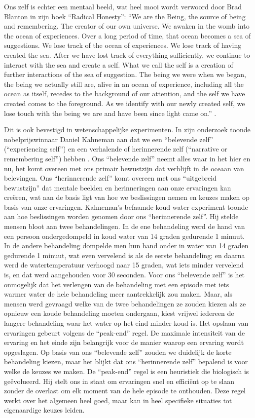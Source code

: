 \documentclass[
  11pt,
]{book}
\begin{document}
Ons zelf is echter een mentaal beeld, wat heel mooi wordt verwoord door Brad Blanton in zijn boek ``Radical Honesty'': ``We are the Being, the source of being and remembering. The creator of our own universe. We awaken in the womb into the ocean of experiences. Over a long period of time, that ocean becomes a sea of suggestions. We lose track of the ocean of experiences. We lose track of having created the sea. After we have lost track of everything sufficiently, we continue to interact with the sea and create a self. What we call the self is a creation of further interactions of the sea of suggestion. The being we were when we began, the being we actually still are, alive in an ocean of experience, including all the ocean as itself, recedes to the background of our attention, and the self we have created comes to the foreground. As we identify with our newly created self, we lose touch with the being we are and have been since light came on.'' \citep{Blanton1996}.

Dit is ook bevestigd in wetenschappelijke experimenten. In zijn onderzoek toonde nobelprijswinnaar Daniel Kahneman aan dat we een ``belevende zelf'' (``experiencing self'') en een verhalende of herinnerende zelf (``narrative or remembering self'') hebben \citep{Kahneman2012}. Ons ``belevende zelf'' neemt alles waar in het hier en nu, het komt overeen met ons primair bewustzijn dat verblijft in de oceaan van belevingen. Ons ``herinnerende zelf'' komt overeen met ons ``uitgebreid bewustzijn'' dat mentale beelden en herinneringen aan onze ervaringen kan creëren, wat aan de basis ligt van hoe we beslissingen nemen en keuzes maken op basis van onze ervaringen. Kahneman's befaamde koud water experiment toonde aan hoe beslissingen worden genomen door ons ``herinnerende zelf''. Hij stelde mensen bloot aan twee behandelingen. In de ene behandeling werd de hand van een persoon ondergedompeld in koud water van 14 graden gedurende 1 minuut. In de andere behandeling dompelde men hun hand onder in water van 14 graden gedurende 1 minuut, wat even vervelend is als de eerste behandeling; en daarna werd de watertemperatuur verhoogd naar 15 graden, wat iets minder vervelend is, en dat werd aangehouden voor 30 seconden. Voor ons ``belevende zelf'' is het onmogelijk dat het verlengen van de behandeling met een episode met iets warmer water de hele behandeling meer aantrekkelijk zou maken. Maar, als mensen werd gevraagd welke van de twee behandelingen ze zouden kiezen als ze opnieuw een koude behandeling moeten ondergaan, kiest vrijwel iedereen de langere behandeling waar het water op het eind minder koud is. Het opslaan van ervaringen gebeurt volgens de ``peak-end'' regel. De maximale intensiteit van de ervaring en het einde zijn belangrijk voor de manier waarop een ervaring wordt opgeslagen. Op basis van ons ``belevende zelf'' zouden we duidelijk de korte behandeling kiezen, maar het blijkt dat ons ``herinnerende zelf'' bepalend is voor welke de keuzes we maken. De ``peak-end'' regel is een heuristiek die biologisch is geëvolueerd. Hij stelt ons in staat om ervaringen snel en efficiënt op te slaan zonder de overlast om elk moment van de hele episode te onthouden. Deze regel werkt over het algemeen heel goed, maar kan in heel specifieke situaties tot eigenaardige keuzes leiden.
\end{document}
